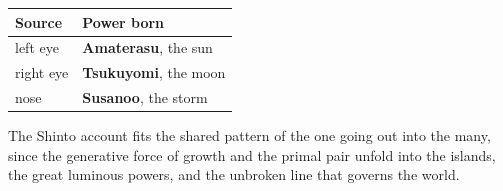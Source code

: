 \begin{longtable}{@{}
ll@{}}
\toprule
Source & Power born \\
\midrule
left eye & \textbf{Amaterasu}, the sun \\
right eye & \textbf{Tsukuyomi}, the moon \\
nose & \textbf{Susanoo}, the storm \\
\bottomrule
\end{longtable}

The Shinto account fits the shared pattern of the one going out into the many, since the generative force of growth and the primal pair unfold into the islands, the great luminous powers, and the unbroken line that governs the world.

